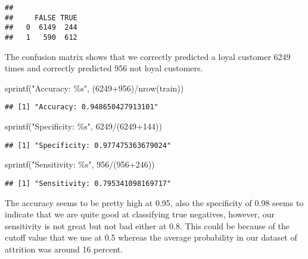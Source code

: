 \documentclass[
]{article}
\newenvironment{Shaded}{\begin{snugshade}}{\end{snugshade}}
\newcommand{\DecValTok}[1]{\textcolor[rgb]{0.00,0.00,0.81}{#1}}
\newcommand{\FunctionTok}[1]{\textcolor[rgb]{0.00,0.00,0.00}{#1}}
\newcommand{\NormalTok}[1]{#1}
\newcommand{\SpecialCharTok}[1]{\textcolor[rgb]{0.00,0.00,0.00}{#1}}
\newcommand{\StringTok}[1]{\textcolor[rgb]{0.31,0.60,0.02}{#1}}
\begin{document}
\begin{verbatim}
##    
##     FALSE TRUE
##   0  6149  244
##   1   590  612
\end{verbatim}

The confusion matrix shows that we correctly predicted a loyal customer
6249 times and correctly predicted 956 not loyal customers.

\begin{Shaded}
\begin{Highlighting}[]
\FunctionTok{sprintf}\NormalTok{(}\StringTok{"Accuracy: \%s"}\NormalTok{, (}\DecValTok{6249}\SpecialCharTok{+}\DecValTok{956}\NormalTok{)}\SpecialCharTok{/}\FunctionTok{nrow}\NormalTok{(train))}
\end{Highlighting}
\end{Shaded}

\begin{verbatim}
## [1] "Accuracy: 0.948650427913101"
\end{verbatim}

\begin{Shaded}
\begin{Highlighting}[]
\FunctionTok{sprintf}\NormalTok{(}\StringTok{"Specificity: \%s"}\NormalTok{, }\DecValTok{6249}\SpecialCharTok{/}\NormalTok{(}\DecValTok{6249}\SpecialCharTok{+}\DecValTok{144}\NormalTok{))}
\end{Highlighting}
\end{Shaded}

\begin{verbatim}
## [1] "Specificity: 0.977475363679024"
\end{verbatim}

\begin{Shaded}
\begin{Highlighting}[]
\FunctionTok{sprintf}\NormalTok{(}\StringTok{"Sensitivity: \%s"}\NormalTok{, }\DecValTok{956}\SpecialCharTok{/}\NormalTok{(}\DecValTok{956}\SpecialCharTok{+}\DecValTok{246}\NormalTok{))}
\end{Highlighting}
\end{Shaded}

\begin{verbatim}
## [1] "Sensitivity: 0.795341098169717"
\end{verbatim}

The accuracy seems to be pretty high at 0.95, also the specificity of
0.98 seems to indicate that we are quite good at classifying true
negatives, however, our sensitivity is not great but not bad either at
0.8. This could be because of the cutoff value that we use at 0.5
whereas the average probability in our dataset of attrition was around
16 percent.
\end{document}
